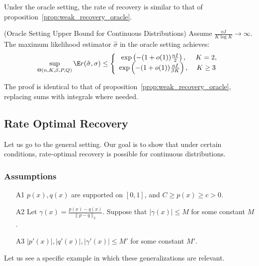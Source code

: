 \documentclass{article}
\begin{document}
Under the oracle setting, the rate of recovery is similar to that of proposition~\ref{prop:weak_recovery_oracle}. 
\begin{proposition} 
\label{prop:weak_recovery_oracle_continuous}
(Oracle Setting Upper Bound for Continuous Distributions)
Assume $\frac{n I}{K \log K} \rightarrow \infty$. The maximum likelihood estimator $\hat{\sigma}$ in the oracle setting achieves:
\[
\sup_{\Theta(n, K, \beta, P, Q)} \E r(\hat{\sigma}, \sigma) \leq \left\{ 
    \begin{array}{cc} 
   \exp \left( - (1 + o(1)) \frac{nI}{2} \right ), \, & K=2, \\
   \exp \left( - (1 + o(1)) \frac{nI}{\beta K} \right ), \,& K\geq 3
  \end{array} \right. 
\]   
\end{proposition}
The proof is identical to that of proposition~\ref{prop:weak_recovery_oracle}, replacing sums with integrals where needed. 


\subsection{Rate Optimal Recovery}

Let us go to the general setting. Our goal is to show that under certain conditions, rate-optimal recovery is possible for continuous distributions.

\subsubsection{Assumptions}
\label{sec:continuous_assumptions}

\begin{enumerate}
\item[A1] $p(x), q(x)$ are supported on $[0,1]$, and $C \geq p(x) \geq c > 0$. 
\item[A2] Let $\gamma(x) = \frac{p(x) - q(x)}{\| p - q \|_2}$. Suppose that $|\gamma(x)| \leq M$ for some constant $M$. 
\item[A3] $|p'(x)|, |q'(x)|, |\gamma'(x)| \leq M'$ for some constant $M'$. 
\end{enumerate}


Let us see a specific example in which these generalizations are relevant. 
\end{document}
